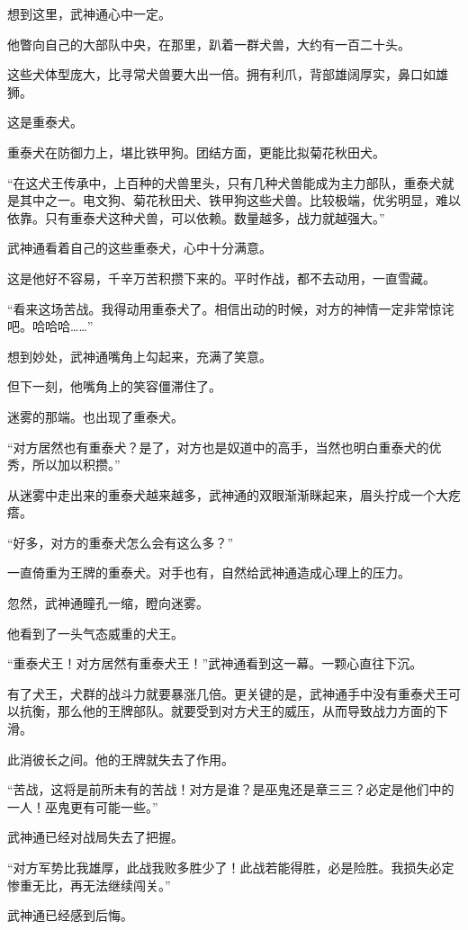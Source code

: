 \begin{this_body}
想到这里，武神通心中一定。

他瞥向自己的大部队中央，在那里，趴着一群犬兽，大约有一百二十头。

这些犬体型庞大，比寻常犬兽要大出一倍。拥有利爪，背部雄阔厚实，鼻口如雄狮。

这是重泰犬。

重泰犬在防御力上，堪比铁甲狗。团结方面，更能比拟菊花秋田犬。

“在这犬王传承中，上百种的犬兽里头，只有几种犬兽能成为主力部队，重泰犬就是其中之一。电文狗、菊花秋田犬、铁甲狗这些犬兽。比较极端，优劣明显，难以依靠。只有重泰犬这种犬兽，可以依赖。数量越多，战力就越强大。”

武神通看着自己的这些重泰犬，心中十分满意。

这是他好不容易，千辛万苦积攒下来的。平时作战，都不去动用，一直雪藏。

“看来这场苦战。我得动用重泰犬了。相信出动的时候，对方的神情一定非常惊诧吧。哈哈哈……”

想到妙处，武神通嘴角上勾起来，充满了笑意。

但下一刻，他嘴角上的笑容僵滞住了。

迷雾的那端。也出现了重泰犬。

“对方居然也有重泰犬？是了，对方也是奴道中的高手，当然也明白重泰犬的优秀，所以加以积攒。”

从迷雾中走出来的重泰犬越来越多，武神通的双眼渐渐眯起来，眉头拧成一个大疙瘩。

“好多，对方的重泰犬怎么会有这么多？”

一直倚重为王牌的重泰犬。对手也有，自然给武神通造成心理上的压力。

忽然，武神通瞳孔一缩，瞪向迷雾。

他看到了一头气态威重的犬王。

“重泰犬王！对方居然有重泰犬王！”武神通看到这一幕。一颗心直往下沉。

有了犬王，犬群的战斗力就要暴涨几倍。更关键的是，武神通手中没有重泰犬王可以抗衡，那么他的王牌部队。就要受到对方犬王的威压，从而导致战力方面的下滑。

此消彼长之间。他的王牌就失去了作用。

“苦战，这将是前所未有的苦战！对方是谁？是巫鬼还是章三三？必定是他们中的一人！巫鬼更有可能一些。”

武神通已经对战局失去了把握。

“对方军势比我雄厚，此战我败多胜少了！此战若能得胜，必是险胜。我损失必定惨重无比，再无法继续闯关。”

武神通已经感到后悔。


\end{this_body}

